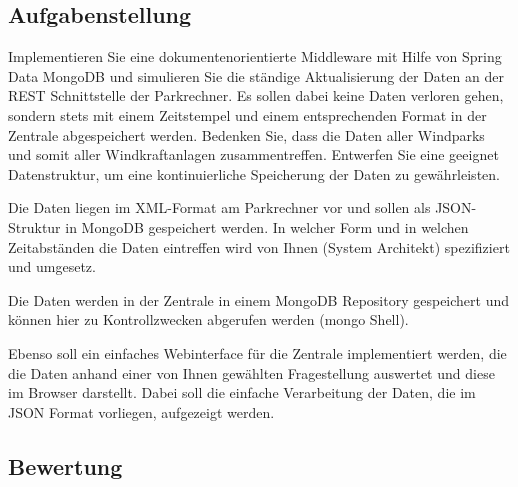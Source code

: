 \subsection{Aufgabenstellung}

Implementieren Sie eine dokumentenorientierte Middleware mit Hilfe von Spring Data MongoDB und simulieren Sie die ständige Aktualisierung der Daten an der REST Schnittstelle der Parkrechner. Es sollen dabei keine Daten verloren gehen, sondern stets mit einem Zeitstempel und einem entsprechenden Format in der Zentrale abgespeichert werden. Bedenken Sie, dass die Daten aller Windparks und somit aller Windkraftanlagen zusammentreffen. Entwerfen Sie eine geeignet Datenstruktur, um eine kontinuierliche Speicherung der Daten zu gewährleisten.

Die Daten liegen im XML-Format am Parkrechner vor und sollen als JSON-Struktur in MongoDB gespeichert werden.
In welcher Form und in welchen Zeitabständen die Daten eintreffen wird von Ihnen (System Architekt) spezifiziert und umgesetz.

Die Daten werden in der Zentrale in einem MongoDB Repository gespeichert und können hier zu Kontrollzwecken abgerufen werden (mongo Shell).

Ebenso soll ein einfaches Webinterface für die Zentrale implementiert werden, die die Daten anhand einer von Ihnen gewählten Fragestellung auswertet und diese im Browser darstellt. Dabei soll die einfache Verarbeitung der Daten, die im JSON Format vorliegen, aufgezeigt werden.

\subsection{Bewertung}

